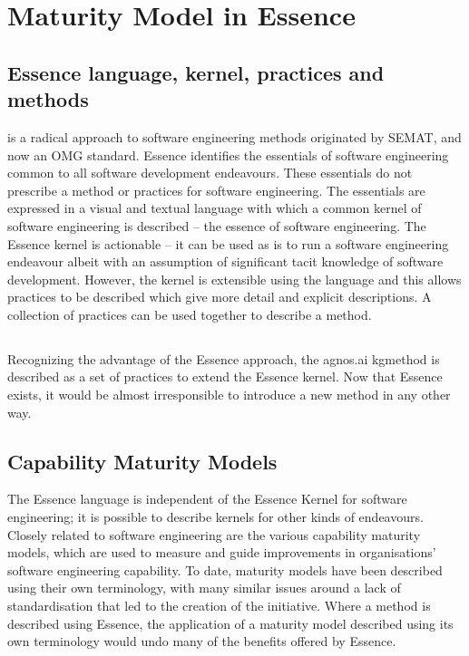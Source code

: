 \pagebreak
\section{Maturity Model in Essence}

\subsection{Essence language, kernel, practices and methods}\label{subsec:essence-language-kernel-practices-and-methods}

 is a radical approach to software engineering methods originated by SEMAT, and now an OMG standard.
Essence identifies the essentials of software engineering common to all software development endeavours.
These essentials do not prescribe a method or practices for software engineering.
The essentials are expressed in a visual and textual language with which a common kernel of software engineering
is described -- the essence of software engineering.
The Essence kernel is actionable -- it can be used as is to run a software engineering endeavour albeit
with an assumption of significant tacit knowledge of software development.
However, the kernel is extensible using the language and this allows practices to be described which give more detail
and explicit descriptions.
A collection of practices can be used together to describe a method.

\subsection{}\label{subsec:agnos-ai-kg-method}

Recognizing the advantage of the Essence approach, the agnos.ai \gls{kgmethod} is described as
a set of practices to extend the Essence kernel.
Now that Essence exists, it would be almost irresponsible to introduce a new method in any other way.

\subsection{Capability Maturity Models}\label{subsec:capability-maturity-models}

The Essence language is independent of the Essence Kernel for software engineering;
it is possible to describe kernels for other kinds of endeavours.
Closely related to software engineering are the various capability maturity models, which are used to measure and
guide improvements in organisations' software engineering capability.
To date, maturity models have been described using their own terminology, with many similar issues around a lack of
standardisation that led to the creation of the  initiative.
Where a method is described using Essence, the application of a maturity model described using its own
terminology would undo many of the benefits offered by Essence.


